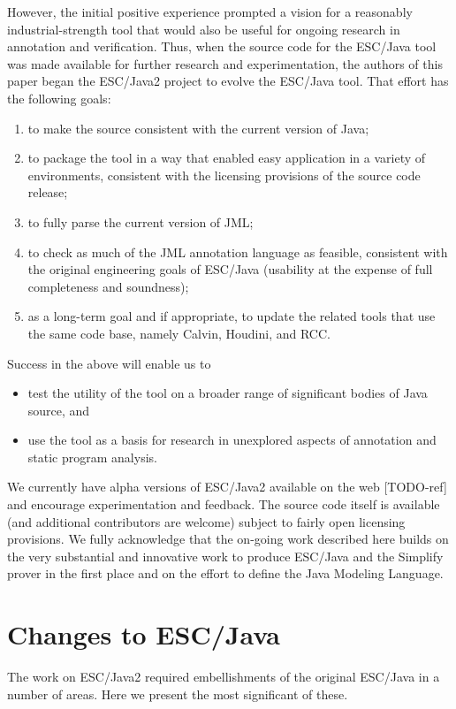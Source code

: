 \documentclass{acm_proc_article-sp}
\begin{document}
However, the initial positive experience prompted a vision for a reasonably
industrial-strength tool that would also be useful for ongoing research in annotation
and verification.
Thus, when the source code for the ESC/Java tool was made available for further 
research and experimentation, the authors of this paper began the ESC/Java2 project
to evolve the ESC/Java tool.  That effort has the following goals:
\begin{enumerate}
\item to make the source consistent with the current version of Java;
\item to package the
tool in a way that enabled easy application in a variety of environments, consistent
with the licensing provisions of the source code release;
\item to fully parse the current version of JML;
\item to check as much of the JML annotation language as feasible, consistent with the
original engineering goals of ESC/Java (usability at the expense of full completeness
and soundness);
\item as a long-term goal and if appropriate,
to update the related tools that use the same code base, namely Calvin, Houdini, and RCC.
\end{enumerate}
Success in the above will enable us to
\begin{itemize}
\item test the utility of the tool on a broader range of significant bodies of Java source, and
\item use the tool as a basis for research in unexplored aspects of annotation and static 
program analysis.
\end{itemize}

We currently have alpha versions of ESC/Java2 available on the web [TODO-ref] and 
encourage experimentation and feedback.  The source code itself is available (and 
additional contributors are welcome) subject to fairly open licensing provisions.
We fully acknowledge that the on-going work described here builds on the very
substantial and innovative work to produce ESC/Java and the Simplify prover in the
first place and on the effort to define the Java Modeling Language.

\section{Changes to ESC/Java}

The work on ESC/Java2 required embellishments of the original ESC/Java in a 
number of areas.  Here we present the most significant of these.
\end{document}
